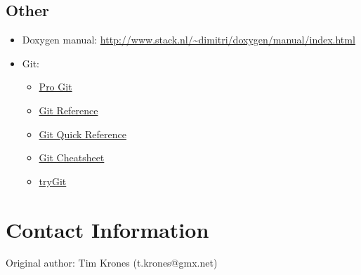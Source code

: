 \documentclass[11pt]{article}
\begin{document}
\subsection{Other}
\label{sec-4-5}
\begin{itemize}
\item Doxygen manual:
\url{http://www.stack.nl/~dimitri/doxygen/manual/index.html}
\item Git:
\begin{itemize}
\item \href{http://git-scm.com/book}{Pro Git}
\item \href{http://gitref.org/}{Git Reference}
\item \href{http://jonas.nitro.dk/git/quick-reference.html}{Git Quick Reference}
\item \href{http://www.ndpsoftware.com/git-cheatsheet.html}{Git Cheatsheet}
\item \href{https://www.codeschool.com/courses/try-git}{tryGit}
\end{itemize}
\end{itemize}

\section{Contact Information}
\label{sec-5}
Original author: Tim Krones (t.krones@gmx.net)
\end{document}
